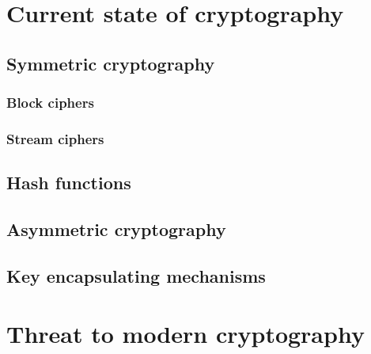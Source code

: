 \chapter{Current state of cryptography}
\label{chapt:1}


\section{Symmetric cryptography}
\label{sec:1_1}


\subsection{Block ciphers}
\label{subsec:1_1_1}


\subsection{Stream ciphers}
\label{subsec:1_1_2}


\section{Hash functions}
\label{sec:1_2}


\section{Asymmetric cryptography}
\label{sec:1_3}


\section{Key encapsulating mechanisms}
\label{sec:1_4}


\chapter{Threat to modern cryptography}
\label{chapt:2}







